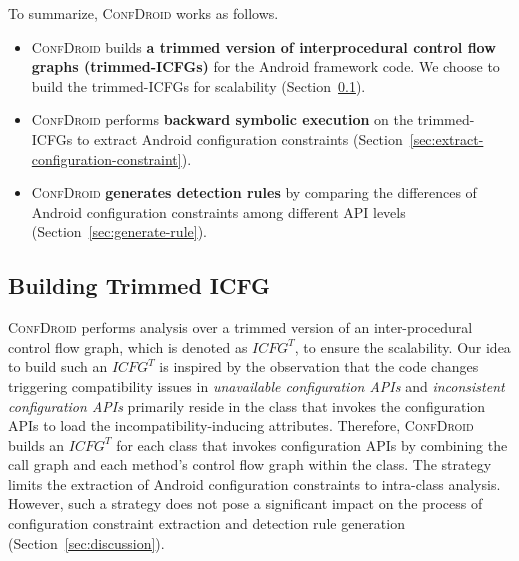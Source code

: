 To summarize, \textsc{ConfDroid} works as follows.
\begin{itemize}
	\item \textsc{ConfDroid} builds \textbf{a trimmed version of interprocedural control flow graphs (trimmed-ICFGs)} for the Android framework code. We choose to build the trimmed-ICFGs for scalability (Section~\ref{sec:building-ICFG}).
	\item \textsc{ConfDroid} performs \textbf{backward symbolic execution} on the trimmed-ICFGs to extract Android configuration constraints (Section~\ref{sec:extract-configuration-constraint}).
	\item \textsc{ConfDroid} \textbf{generates detection rules} by comparing the differences of Android configuration constraints among different API levels (Section~\ref{sec:generate-rule}).
\end{itemize}

\subsection{Building Trimmed ICFG}
\label{sec:building-ICFG}
\textsc{ConfDroid} performs analysis over a trimmed version of an
inter-procedural control flow graph, which is denoted as $ICFG^T$, to ensure
the scalability.
Our idea to build such an $ICFG^T$ is inspired by the observation that the code
changes triggering compatibility issues in \textit{unavailable configuration
APIs} and \textit{inconsistent configuration APIs} primarily reside in the class that invokes the configuration APIs to load the incompatibility-inducing
attributes.
Therefore, \textsc{ConfDroid} builds an $ICFG^T$ for each class that invokes configuration APIs by combining the call graph and each method's control flow graph within the class.
The strategy limits the extraction of Android configuration constraints to
intra-class analysis. 
However, such a strategy does not pose a significant impact on the process of configuration constraint extraction and detection rule generation (Section~\ref{sec:discussion}).


